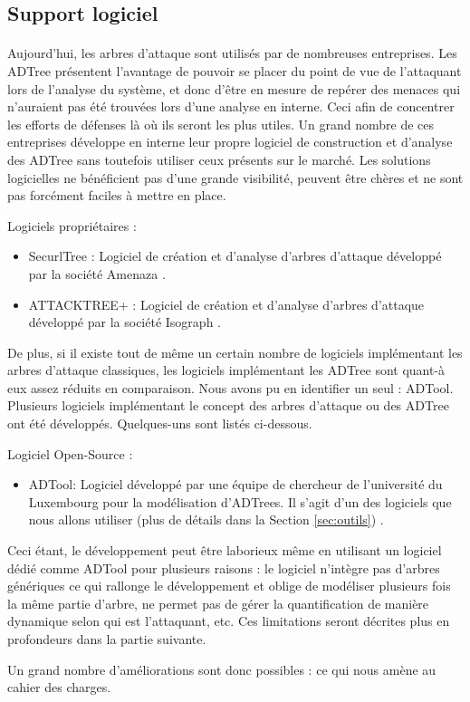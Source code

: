 	\subsection{Support logiciel}

	\paragraph{}

	Aujourd'hui, les arbres d'attaque sont utilisés par de nombreuses entreprises. Les ADTree présentent l'avantage de pouvoir se placer du point de vue de l'attaquant lors de l'analyse du système, et donc d'être en mesure de repérer des menaces qui n'auraient pas été trouvées lors d'une analyse en interne. Ceci afin de concentrer les efforts de défenses là où ils seront les plus utiles. Un grand nombre de ces entreprises développe en interne leur propre logiciel de construction et d'analyse des ADTree sans toutefois utiliser ceux présents sur le marché. Les solutions logicielles ne bénéficient pas d'une grande visibilité, peuvent être chères et ne sont pas forcément faciles à mettre en place. 

Logiciels propriétaires :
        \begin{itemize}
	        \item SecurlTree : Logiciel de création et d'analyse d'arbres d'attaque développé par la société Amenaza \cite{SecurlTree}.
	        \item ATTACKTREE+ : Logiciel de création et d'analyse d'arbres d'attaque développé par la société Isograph \cite{ATTACKTREE+}.
        \end{itemize}

De plus, si il existe tout de même un certain nombre de logiciels implémentant les arbres d'attaque classiques, les logiciels implémentant les ADTree sont quant-à eux assez réduits en comparaison. Nous avons pu en identifier un seul : ADTool. 
		Plusieurs logiciels implémentant le concept des arbres d'attaque ou des ADTree ont été développés. Quelques-uns sont listés ci-dessous.
        
        Logiciel Open-Source :
        \begin{itemize}
        	\item ADTool: Logiciel développé par une équipe de chercheur de l'université du Luxembourg pour la modélisation d'ADTrees. Il s'agit d'un des logiciels que nous allons utiliser (plus de détails dans la Section \ref{sec:outils}) \cite{ADTool}.
        \end{itemize}

            

            Ceci étant, le développement peut être laborieux même en utilisant un logiciel dédié comme ADTool pour plusieurs raisons : le logiciel n’intègre pas d'arbres génériques ce qui rallonge le développement et oblige de modéliser plusieurs fois la même partie d'arbre, ne permet pas de gérer la quantification de manière dynamique selon qui est l'attaquant, etc. Ces limitations seront décrites plus en profondeurs dans la partie suivante.

            Un grand nombre d'améliorations sont donc possibles : ce qui nous amène au cahier des charges.
